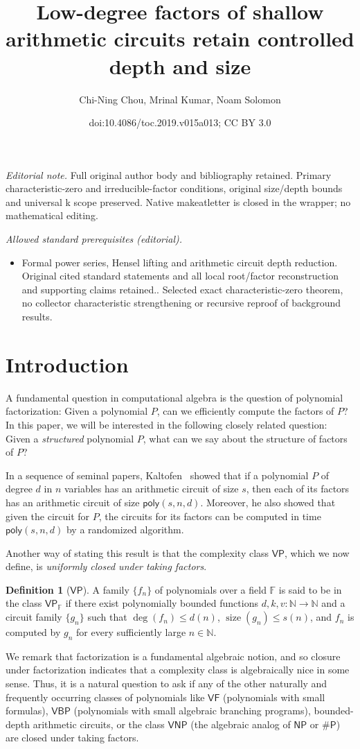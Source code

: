 \documentclass[11pt]{article}
\title{Low-degree factors of shallow arithmetic circuits retain controlled depth and size}
\author{Chi-Ning Chou, Mrinal Kumar, Noam Solomon}
\date{doi:10.4086/toc.2019.v015a013; CC BY 3.0}
\numberwithin{equation}{section}
\theoremstyle{definition}
\newtheorem{definition}[theorem]{Definition}
\theoremstyle{plain}
\newcommand{\N}{\mathbb N}
\newcommand{\ComplexityFont}[1]{{\ensuremath{\mathsf{#1}}}}
\newcommand{\func}[1]{{\ensuremath{\mathsf{#1}}}}
\newcommand{\class}[1]{\ComplexityFont{#1}}
\newcommand{\VNP}{\ComplexityFont{VNP}}
\newcommand{\VP}{\ComplexityFont{VP}}
\newcommand{\NP}{\ComplexityFont{NP}}
\newcommand{\F}{\mathbb{F}}
\DeclareMathOperator{\size}{size}
\newcommand{\poly}{\func{poly}}
\begin{document}
\maketitle
\noindent\textit{Editorial note.} Full original author body and bibliography retained. Primary characteristic-zero and irreducible-factor conditions, original size/depth bounds and universal k scope preserved. Native makeatletter is closed in the wrapper; no mathematical editing.\par\medskip
\noindent\textit{Allowed standard prerequisites (editorial).}\begin{itemize}
\item Formal power series, Hensel lifting and arithmetic circuit depth reduction. Original cited standard statements and all local root/factor reconstruction and supporting claims retained.. Selected exact characteristic-zero theorem, no collector characteristic strengthening or recursive reproof of background results.
\end{itemize}\medskip
\section{Introduction}
A fundamental question in computational algebra is the question of polynomial factorization: %
Given a polynomial $P$, can we efficiently compute the factors of $P$? In this paper, we will be interested in the following closely related
question: %
Given a \emph{structured} polynomial $P$, what can we say about the structure of factors of $P$? 

In a sequence of seminal
%
papers,     %
%
Kaltofen~\cite{kalt85, Kal86, Kal87, k89}
showed that  if a polynomial $P$ of degree $d$ in $n$ variables has an arithmetic circuit of size $s$, then each of its factors has an arithmetic circuit of size $\poly(s, n, d)$. Moreover, he also showed that given the circuit for $P$, the circuits for its factors can be computed in time $\poly(s, n, d)$ by a randomized algorithm. 

Another way of stating this result is that the complexity class $\VP$, which we now define, is \emph{uniformly closed under taking factors}.
\begin{definition}[$\VP$]\label{def:VP}
%
A family $\{f_n\}$ of polynomials   %
over a field $\F$ is said to be in the class $\VP_{\F}$ if there exist polynomially bounded functions $d, k, v : \N\rightarrow \N$ and a circuit family $\{g_n\}$ such that $\deg(f_n)\leq d(n)$, $\size(g_n)\leq s(n)$, and $f_n$ is computed by $g_n$ for every sufficiently large $n \in \N$.
\end{definition}
We remark that factorization is a fundamental algebraic notion, and so closure under factorization indicates that a complexity class is algebraically nice in some sense. Thus, it is a natural question to ask if any of the other naturally and frequently occurring classes of polynomials like $\class{VF}$ (polynomials with small formulas), $\class{VBP}$ (polynomials with small algebraic branching programs),
%
bounded-depth   %
arithmetic circuits, or the class $\VNP$ (the algebraic analog of $\NP$ or $\#\class{P}$) are closed under taking factors. 
\end{document}
